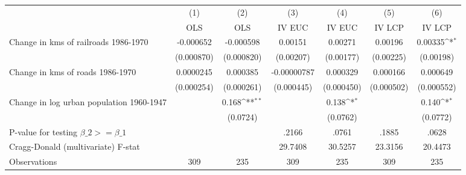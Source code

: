 {
\def\sym#1{\ifmmode^{#1}\else\(^{#1}\)\fi}
\begin{tabular}{l*{6}{c}}
\hline\hline
                &\multicolumn{1}{c}{(1)}&\multicolumn{1}{c}{(2)}&\multicolumn{1}{c}{(3)}&\multicolumn{1}{c}{(4)}&\multicolumn{1}{c}{(5)}&\multicolumn{1}{c}{(6)}\\
                &\multicolumn{1}{c}{OLS}&\multicolumn{1}{c}{OLS}&\multicolumn{1}{c}{IV EUC}&\multicolumn{1}{c}{IV EUC}&\multicolumn{1}{c}{IV LCP}&\multicolumn{1}{c}{IV LCP}\\
\hline
Change in kms of railroads 1986-1970&-0.000652         &-0.000598         &  0.00151         &  0.00271         &  0.00196         &  0.00335\sym{*}  \\
                &(0.000870)         &(0.000820)         &(0.00207)         &(0.00177)         &(0.00225)         &(0.00198)         \\
[1em]
Change in kms of roads 1986-1970&0.0000245         & 0.000385         &-0.00000787         & 0.000329         & 0.000166         & 0.000649         \\
                &(0.000254)         &(0.000261)         &(0.000445)         &(0.000450)         &(0.000502)         &(0.000552)         \\
[1em]
Change in log urban population 1960-1947&                  &    0.168\sym{**} &                  &    0.138\sym{*}  &                  &    0.140\sym{*}  \\
                &                  & (0.0724)         &                  & (0.0762)         &                  & (0.0772)         \\
\hline
P-value for testing $\beta\_{2} >= \beta\_{1}$&                  &                  &    .2166         &    .0761         &    .1885         &    .0628         \\
Cragg-Donald (multivariate) F-stat&                  &                  &  29.7408         &  30.5257         &  23.3156         &  20.4473         \\
Observations    &      309         &      235         &      309         &      235         &      309         &      235         \\
\hline\hline
\end{tabular}
}
